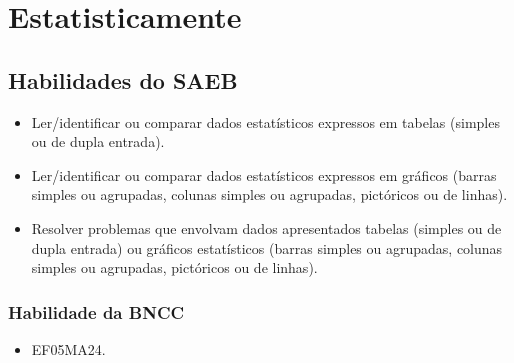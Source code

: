\chapter{Estatisticamente}

\section*{Habilidades do SAEB}

\begin{itemize}
\item Ler/identificar ou comparar dados estatísticos expressos em tabelas
(simples ou de dupla entrada).

\item Ler/identificar ou comparar dados estatísticos expressos em gráficos
(barras simples ou agrupadas, colunas simples ou agrupadas, pictóricos
ou de linhas).

\item Resolver problemas que envolvam dados apresentados tabelas (simples ou
de dupla entrada) ou gráficos estatísticos (barras simples ou agrupadas,
colunas simples ou agrupadas, pictóricos ou de linhas).
\end{itemize}

\subsection{Habilidade da BNCC}

\begin{itemize}
\item EF05MA24.
\end{itemize}


